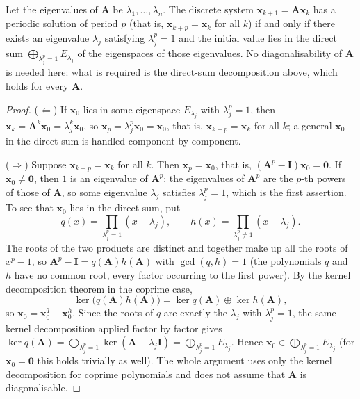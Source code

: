 \begin{proposition}\label{prop:linear_system_periodic_solution}
Let the eigenvalues of $\mathbf{A}$ be $\lambda_1, \dots, \lambda_n$. The discrete system $\mathbf{x}_{k+1} = \mathbf{A} \mathbf{x}_k$ has a periodic solution of period $p$ (that is, $\mathbf{x}_{k+p} = \mathbf{x}_k$ for all $k$) if and only if there exists an eigenvalue $\lambda_j$ satisfying $\lambda_j^p = 1$ and the initial value lies in the direct sum $\bigoplus_{\lambda_j^p=1}E_{\lambda_j}$ of the eigenspaces of those eigenvalues. No diagonalisability of $\mathbf{A}$ is needed here: what is required is the direct-sum decomposition above, which holds for every $\mathbf{A}$.
\end{proposition}

\begin{proof}
($\Leftarrow$) If $\mathbf{x}_0$ lies in some eigenspace $E_{\lambda_j}$ with $\lambda_j^p = 1$, then $\mathbf{x}_k = \mathbf{A}^k\mathbf{x}_0 = \lambda_j^k\mathbf{x}_0$, so $\mathbf{x}_p = \lambda_j^p\mathbf{x}_0 = \mathbf{x}_0$, that is, $\mathbf{x}_{k+p}=\mathbf{x}_k$ for all $k$; a general $\mathbf{x}_0$ in the direct sum is handled component by component.

($\Rightarrow$) Suppose $\mathbf{x}_{k+p}=\mathbf{x}_k$ for all $k$. Then $\mathbf{x}_p=\mathbf{x}_0$, that is, $(\mathbf{A}^p-\mathbf{I})\mathbf{x}_0=\mathbf{0}$. If $\mathbf{x}_0\ne\mathbf{0}$, then $1$ is an eigenvalue of $\mathbf{A}^p$; the eigenvalues of $\mathbf{A}^p$ are the $p$-th powers of those of $\mathbf{A}$, so some eigenvalue $\lambda_j$ satisfies $\lambda_j^p=1$, which is the first assertion. To see that $\mathbf{x}_0$ lies in the direct sum, put
\[
q(x)=\prod_{\lambda_j^p=1}(x-\lambda_j),\qquad h(x)=\prod_{\lambda_j^p\ne1}(x-\lambda_j).
\]
The roots of the two products are distinct and together make up all the roots of $x^p-1$, so $\mathbf{A}^p-\mathbf{I}=q(\mathbf{A})h(\mathbf{A})$ with $\gcd(q,h)=1$ (the polynomials $q$ and $h$ have no common root, every factor occurring to the first power). By the kernel decomposition theorem in the coprime case,
\[
\ker\bigl(q(\mathbf{A})h(\mathbf{A})\bigr)=\ker q(\mathbf{A})\oplus\ker h(\mathbf{A}),
\]
so $\mathbf{x}_0=\mathbf{x}_0^{q}+\mathbf{x}_0^{h}$. Since the roots of $q$ are exactly the $\lambda_j$ with $\lambda_j^p=1$, the same kernel decomposition applied factor by factor gives $\ker q(\mathbf{A})=\bigoplus_{\lambda_j^p=1}\ker(\mathbf{A}-\lambda_j\mathbf{I})=\bigoplus_{\lambda_j^p=1}E_{\lambda_j}$. Hence $\mathbf{x}_0\in\bigoplus_{\lambda_j^p=1}E_{\lambda_j}$ (for $\mathbf{x}_0=\mathbf{0}$ this holds trivially as well). The whole argument uses only the kernel decomposition for coprime polynomials and does not assume that $\mathbf{A}$ is diagonalisable.
\end{proof}

